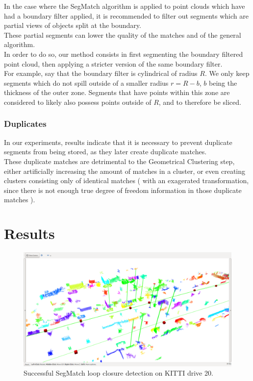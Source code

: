 In the case where the SegMatch algorithm is applied to point clouds which have had a boundary filter applied, it is recommended to filter out segments which are partial views of objects split at the boundary.\\

These partial segments can lower the quality of the matches and of the general algorithm.\\

In order to do so, our method consists in first segmenting the boundary filtered point cloud, then applying a stricter version of the same boundary filter.\\

For example, say that the boundary filter is cylindrical of radius $R$. We only keep segments which do not spill outside of a smaller radius $r = R-b$, $b$ being the thickness of the outer zone. Segments that have points within this zone are considered to likely also possess points outside of $R$, and to therefore be sliced.\\

\subsubsection{Duplicates}
\label{subsub:sec:duplicates}

In our experiments, results indicate that it is necessary to prevent duplicate segments from being stored, as they later create duplicate matches.\\ 

These duplicate matches are detrimental to the Geometrical Clustering step, either artificially increasing the amount of matches in a cluster, or even creating clusters consisting only of identical matches ( with an exagerated transformation, since there is not enough true degree of freedom information in those duplicate matches ).


\section{Results}
\label{sec:segmatch-results}

\begin{figure}
  \centering
  \includegraphics[width=5.2in]{images/segmatchae.png}
  \caption{Successful SegMatch loop closure detection on KITTI drive 20.}
  \label{fig:segmatch-loop-closure}
\end{figure}



